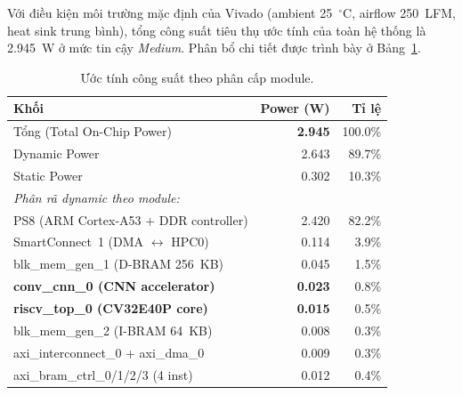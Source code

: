 Với điều kiện môi trường mặc định của Vivado (ambient 25~$^\circ$C, airflow 250~LFM, heat sink trung bình), tổng công suất tiêu thụ ước tính của toàn hệ thống là 2.945~W ở mức tin cậy \textit{Medium}. Phân bổ chi tiết được trình bày ở Bảng~\ref{tab:power-by-hierarchy}.

\begin{table}[!h]
    \centering
    \caption{Ước tính công suất theo phân cấp module.}
    \label{tab:power-by-hierarchy}
    \begin{tabular}{|l|r|r|}
        \hline
        \textbf{Khối}                                       & \textbf{Power (W)} & \textbf{Tỉ lệ} \\
        \hline
        Tổng (Total On-Chip Power)                          & \textbf{2.945}     & 100.0\% \\
        \hline
        \quad Dynamic Power                                 & 2.643              & 89.7\% \\
        \quad Static Power                                  & 0.302              & 10.3\% \\
        \hline
        \multicolumn{3}{|l|}{\textit{Phân rã dynamic theo module:}} \\
        \hline
        \quad PS8 (ARM Cortex-A53 + DDR controller)         & 2.420              & 82.2\% \\
        \quad SmartConnect~1 (DMA $\leftrightarrow$ HPC0)   & 0.114              &  3.9\% \\
        \quad blk\_mem\_gen\_1 (D-BRAM 256~KB)              & 0.045              &  1.5\% \\
        \quad \textbf{conv\_cnn\_0 (CNN accelerator)}       & \textbf{0.023}     &  0.8\% \\
        \quad \textbf{riscv\_top\_0 (CV32E40P core)}        & \textbf{0.015}     &  0.5\% \\
        \quad blk\_mem\_gen\_2 (I-BRAM 64~KB)               & 0.008              &  0.3\% \\
        \quad axi\_interconnect\_0 + axi\_dma\_0            & 0.009              &  0.3\% \\
        \quad axi\_bram\_ctrl\_0/1/2/3 (4 inst)             & 0.012              &  0.4\% \\
        \hline
    \end{tabular}
\end{table}

